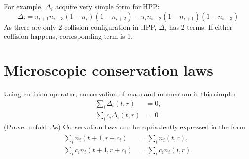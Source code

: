\bigskip

For example, $\Delta_i$ acquire very simple form for HPP:
\begin{equation}
\Delta_i = n_{i+1} n_{i+3}( 1 - n_i)(1 - n_{i+2}) - n_i n_{i+2}(1-n_{i+1})(1 - n_{i+3})
\end{equation}
As there are only 2 collision configuration in HPP, $\Delta_i$ has 2 terms.
If either collision happens, corresponding term is 1.

\section{Microscopic conservation laws}
Using collision operator, conservation of mass and momentum is this simple:
\begin{subequations}
\begin{align}
\sum_i \Delta_i(t,r) &= 0,\\
%
\sum_i c_i \Delta_i(t,r) &= 0
\end{align}
\end{subequations}
(Prove: unfold $\Delta$s)
Conservation laws can be equivalently expressed in the form
\begin{align} \label{cons1}
\begin{split}
\sum_i n_i(t+1, r + c_i) &= \sum_i n_i(t,r), \\
\sum_i c_i n_i(t+1, r + c_i) &= \sum_i c_i n_i(t,r).
\end{split}
\end{align}